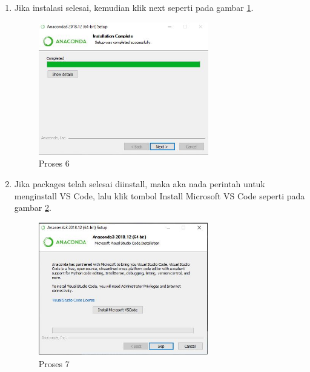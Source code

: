 \begin{itemize}
\begin{enumerate}
\item Jika instalasi selesai, kemudian klik next seperti pada gambar \ref{gambar6}.
\begin{figure}[ht]
	\centerline{\includegraphics[width=0.70\textwidth]{figures/1/1144124/f.JPG}}
	\caption{Proses 6 }
	\label{gambar6}
\end{figure}

\item Jika packages telah selesai diinstall, maka aka nada perintah untuk menginstall VS Code, lalu klik tombol Install Microsoft VS Code seperti pada gambar \ref{gambar7}.
\begin{figure}[ht]
	\centerline{\includegraphics[width=0.70\textwidth]{figures/1/1144124/g.JPG}}
	\caption{Proses 7}
	\label{gambar7}
\end{figure}


\end{enumerate}
\end{itemize}

